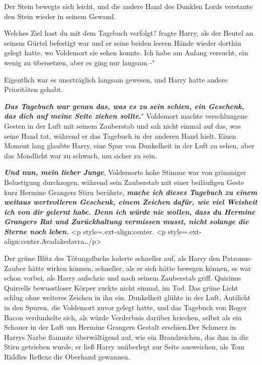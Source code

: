 Der Stein bewegte sich leicht, und die andere Hand des Dunklen Lords verstaute
den Stein wieder in seinem Gewand.

\glqq{}Welches Ziel hast du mit dem Tagebuch verfolgt?\grqq{} fragte Harry, als
der Beutel an seinem Gürtel befestigt war und er seine beiden leeren Hände
wieder dorthin gelegt hatte, wo Voldemort sie sehen konnte. \glqq{}Ich habe am
Anfang versucht, ein wenig zu übersetzen, aber es ging nur langsam -"

Eigentlich war es unerträglich langsam gewesen, und Harry hatte andere
Prioritäten gehabt.

\glqq{}\textbf{\emph{Das Tagebuch war genau das, was es zu sein schien, ein
Geschenk, das dich auf meine Seite ziehen sollte.}}" Voldemort machte
verschlungene Gesten in der Luft mit seinem Zauberstab und sah nicht einmal auf
das, was seine Hand tat, während er das Tagebuch in der anderen Hand hielt.
Einen Moment lang glaubte Harry, eine Spur von Dunkelheit in der Luft zu sehen,
aber das Mondlicht war zu schwach, um sicher zu sein.

\glqq{}\textbf{\emph{Und nun, mein lieber Junge}}\grqq{}, Voldemorts hohe Stimme
war von grimmiger Belustigung durchzogen, während sein Zauberstab mit einer
beiläufigen Geste kurz Hermine Grangers Stirn berührte, \glqq
\textbf{\emph{mache ich dieses Tagebuch zu einem weitaus wertvolleren Geschenk,
einem Zeichen dafür, wie viel Weisheit ich von dir gelernt habe. Denn ich würde
nie wollen, dass du Hermine Grangers Rat und Zurückhaltung vermissen musst,
nicht solange die Sterne noch leben.}} <p
style=\grqq{}.ext-align:center\grqq{}.\textbf{}  <p
style=\grqq{}.ext-align:center\grqq{}.Avadakedavra\textbf{\emph{.}}\grqq{}./p>

Der grüne Blitz des Tötungsfluchs loderte schneller auf, als Harry den
Patronus-Zauber hätte wirken können, schneller, als er sich hätte bewegen
können, es war schon vorbei, als Harry aufschrie und nach seinem Zauberstab
griff. Quirinus Quirrells bewusstloser Körper zuckte nicht einmal, im Tod. Das
grüne Licht schlug ohne weiteres Zeichen in ihn ein. Dunkelheit glühte in der
Luft, Antilicht in den Spuren, die Voldemort zuvor gelegt hatte, und das
Tagebuch von Roger Bacon verdunkelte sich, als würde Verderbnis darüber
kriechen, selbst als ein Schauer in der Luft um Hermine Grangers Gestalt
erschien.Der Schmerz in Harrys Narbe flammte überwältigend auf, wie ein
Brandzeichen, das ihm in die Stirn getrieben wurde, er ließ Harry unüberlegt zur
Seite ausweichen, als Tom Riddles Reflexe die Oberhand gewannen.

